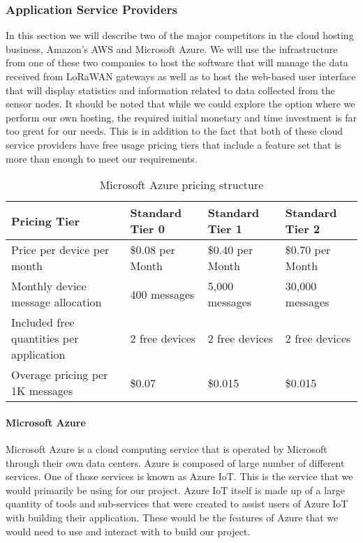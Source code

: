 \subsubsection{Application Service Providers}
In this section we will describe two of the major competitors in the cloud hosting business, Amazon's AWS and Microsoft Azure. We will use the infrastructure from one of these two companies to host the software that will manage the data received from LoRaWAN gateways as well as to host the web-based user interface that will display statistics and information related to data collected from the sensor nodes. It should be noted that while we could explore the option where we perform our own hosting, the required initial monetary and time investment is far too great for our needs. This is in addition to the fact that both of these cloud service providers have free usage pricing tiers that include a feature set that is more than enough to meet our requirements.

\begin{table}[t]
\centering\footnotesize
\caption{Microsoft Azure pricing structure}
\begin{tabular}{|l|l|l|l|}
\hline
Pricing Tier & Standard Tier 0 & Standard Tier 1 & Standard Tier 2 \\
\hline\hline
Price per device per month & \$0.08 per Month & \$0.40 per Month & \$0.70 per Month \\\hline
Monthly device message allocation & 400 messages & 5,000 messages & 30,000 messages \\\hline
Included free quantities per application & 2 free devices & 2 free devices  & 2 free devices  \\\hline
Overage pricing per 1K messages & \$0.07 & \$0.015 & \$0.015 \\\hline
\end{tabular}
\label{tab:azure-pricing}
\end{table}

\paragraph{Microsoft Azure}
Microsoft Azure is a cloud computing service that is operated by Microsoft through their own data centers. Azure is composed of large number of different services. One of those services is known as Azure IoT. This is the service that we would primarily be using for our project. Azure IoT itself is made up of a large quantity of tools and sub-services that were created to assist users of Azure IoT with building their application. These would be the features of Azure that we would need to use and interact with to build our project.

